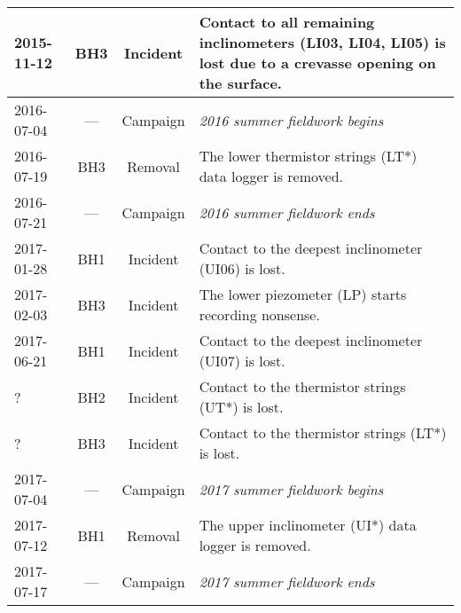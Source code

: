 \documentclass[utf8]{article}
\begin{document}
\begin{table}
{\begin{tabular}{lccp{95mm}}
        2015-11-12 & BH3  & Incident & Contact to all remaining inclinometers
                                       (LI03, LI04, LI05) is lost due to
                                       a crevasse opening on the surface. \\
        \hline
        2016-07-04 & ---  & Campaign & \emph{2016 summer fieldwork begins} \\
        2016-07-19 & BH3  & Removal  & The lower thermistor strings (LT*) data
                                       logger is removed. \\
        2016-07-21 & ---  & Campaign & \emph{2016 summer fieldwork ends} \\
        \hline
        2017-01-28 & BH1  & Incident & Contact to the deepest inclinometer
                                       (UI06) is lost. \\
        2017-02-03 & BH3  & Incident & The lower piezometer (LP) starts
                                       recording nonsense. \\
        2017-06-21 & BH1  & Incident & Contact to the deepest inclinometer
                                       (UI07) is lost. \\
        ?          & BH2  & Incident & Contact to the thermistor strings (UT*)
                                       is lost. \\
        ?          & BH3  & Incident & Contact to the thermistor strings (LT*)
                                       is lost. \\
        \hline
        2017-07-04 & ---  & Campaign & \emph{2017 summer fieldwork begins} \\
        2017-07-12 & BH1  & Removal  & The upper inclinometer (UI*) data logger
                                       is removed. \\
        2017-07-17 & ---  & Campaign & \emph{2017 summer fieldwork ends} \\
        \hline
      \end{tabular}}
    \end{table}


\end{document}
